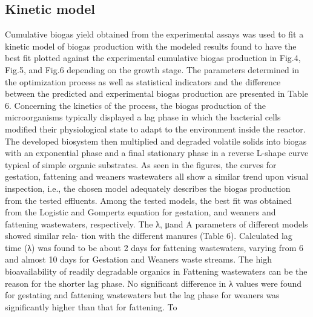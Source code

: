 \subsection{Kinetic model}
Cumulative biogas yield obtained from the experimental assays was used to fit a kinetic model of biogas production with the modeled results found to have the best fit plotted against the experimental cumulative biogas production in Fig.4, Fig.5, and Fig.6 depending on the growth stage. The parameters determined in the optimization process as well as statistical indicators and the difference between the predicted and experimental biogas production are presented in Table 6.
Concerning the kinetics of the process, the biogas production of the microorganisms typically displayed a lag phase in which the bacterial cells modified their physiological state to adapt to the environment inside the reactor. The developed biosystem then multiplied and degraded volatile solids into biogas with an exponential phase and a final stationary phase in a reverse L-shape curve typical of simple organic substrates. As seen in the figures, the curves for gestation, fattening and weaners wastewaters all show a similar trend upon visual inspection, i.e., the chosen model adequately describes the biogas production from the tested effluents. Among the tested models, the best fit was obtained from the Logistic and Gompertz equation for gestation, and weaners and fattening wastewaters, respectively. The λ, μ\textsubscriptm and A  parameters of different models showed similar rela- tion with the different manures (Table 6). Calculated lag time (λ) was found to be about 2 days for fattening wastewaters, varying from 6 and almost 10 days for Gestation and Weaners waste streams. The high bioavailability of readily degradable organics in Fattening wastewaters can be the reason for the shorter lag phase. No significant difference in λ values were found for gestating and fattening wastewaters but the lag phase for weaners was significantly higher than that for fattening. To